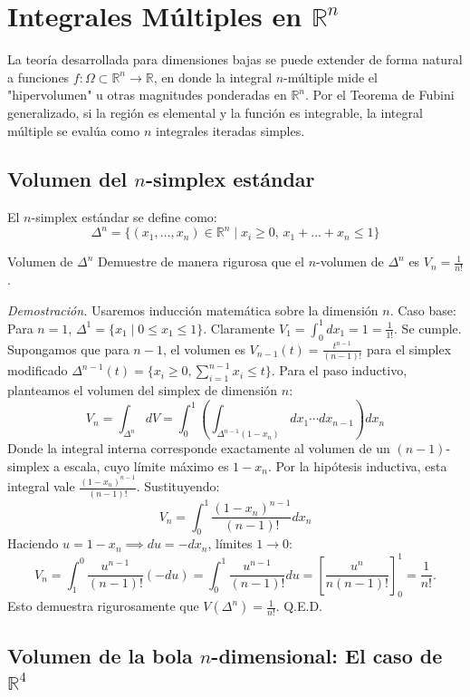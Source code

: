 \documentclass[11pt,a4paper]{article}
\begin{document}
\section{Integrales Múltiples en $\mathbb{R}^n$}

La teoría desarrollada para dimensiones bajas se puede extender de forma natural a funciones $f: \Omega \subset \mathbb{R}^n \to \mathbb{R}$, en donde la integral $n$-múltiple mide el "hipervolumen" u otras magnitudes ponderadas en $\mathbb{R}^n$. Por el Teorema de Fubini generalizado, si la región es elemental y la función es integrable, la integral múltiple se evalúa como $n$ integrales iteradas simples.

\subsection{Volumen del $n$-simplex estándar}

El $n$-simplex estándar se define como:
\[
\Delta^n = \{ (x_1, \ldots, x_n) \in \mathbb{R}^n \mid x_i \geq 0, \, x_1 + \dots + x_n \leq 1 \}
\]

\begin{ejemplobox}{Volumen de $\Delta^n$}{}
    Demuestre de manera rigurosa que el $n$-volumen de $\Delta^n$ es $V_n = \frac{1}{n!}$.
\end{ejemplobox}

\textit{Demostración.} Usaremos inducción matemática sobre la dimensión $n$.
Caso base: Para $n=1$, $\Delta^1 = \{ x_1 \mid 0 \leq x_1 \leq 1 \}$. Claramente $V_1 = \int_0^1 dx_1 = 1 = \frac{1}{1!}$. Se cumple.
Supongamos que para $n-1$, el volumen es $V_{n-1}(t) = \frac{t^{n-1}}{(n-1)!}$ para el simplex modificado $\Delta^{n-1}(t) = \{ x_i \geq 0, \sum_{i=1}^{n-1} x_i \leq t \}$.
Para el paso inductivo, planteamos el volumen del simplex de dimensión $n$:
\[
V_n = \int_{\Delta^n} dV = \int_0^1 \left( \int_{\Delta^{n-1}(1-x_n)} d x_1 \cdots d x_{n-1} \right) dx_n
\]
Donde la integral interna corresponde exactamente al volumen de un $(n-1)$-simplex a escala, cuyo límite máximo es $1-x_n$. Por la hipótesis inductiva, esta integral vale $\frac{(1-x_n)^{n-1}}{(n-1)!}$. Sustituyendo:
\[
V_n = \int_0^1 \frac{(1-x_n)^{n-1}}{(n-1)!} dx_n
\]
Haciendo $u = 1-x_n \implies du = -dx_n$, límites $1 \to 0$:
\[
V_n = \int_1^0 \frac{u^{n-1}}{(n-1)!} (-du) = \int_0^1 \frac{u^{n-1}}{(n-1)!} du = \left[ \frac{u^n}{n(n-1)!} \right]_0^1 = \frac{1}{n!}.
\]
Esto demuestra rigurosamente que $V(\Delta^n) = \frac{1}{n!}$. Q.E.D.

\subsection{Volumen de la bola $n$-dimensional: El caso de $\mathbb{R}^4$}
\end{document}
